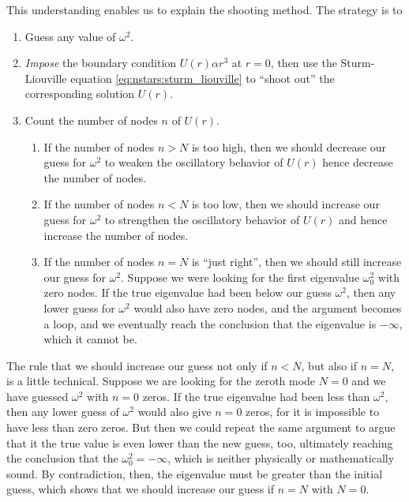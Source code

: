 This understanding enables us to explain the shooting method.
The strategy is to
\begin{enumerate}
\item Guess any value of $\omega^2$.
\item \emph{Impose} the boundary condition $U(r) \alpha r^3$ at $r = 0$, then use the Sturm-Liouville equation \eqref{eq:nstars:sturm_liouville} to ``shoot out'' the corresponding solution $U(r)$.
\item Count the number of nodes $n$ of $U(r)$.
      \begin{enumerate}
      \item If the number of nodes $n > N$ is too high, then we should decrease our guess for $\omega^2$ to weaken the oscillatory behavior of $U(r)$ hence decrease the number of nodes.
      \item If the number of nodes $n < N$ is too low, then we should increase our guess for $\omega^2$ to strengthen the oscillatory behavior of $U(r)$ and hence increase the number of nodes.
      \item If the number of nodes $n = N$ is ``just right'', then we should still increase our guess for $\omega^2$.
            Suppose we were looking for the first eigenvalue $\omega_0^2$ with zero nodes.
            If the true eigenvalue had been below our guess $\omega^2$, then any lower guess for $\omega^2$ would also have zero nodes, and the argument becomes a loop, and we eventually reach the conclusion that the eigenvalue is $-\infty$, which it cannot be.
      \end{enumerate}
\end{enumerate}
The rule that we should increase our guess not only if $n < N$, but also if $n = N$, is a little technical.
Suppose we are looking for the zeroth mode $N = 0$ and we have guessed $\omega^2$ with $n = 0$ zeros.
If the true eigenvalue had been less than $\omega^2$, then any lower guess of $\omega^2$ would also give $n = 0$ zeros, for it is impossible to have less than zero zeros.
But then we could repeat the same argument to argue that it the true value is even lower than the new guess, too, ultimately reaching the conclusion that the $\omega_0^2 = -\infty$, which is neither physically or mathematically sound.
By contradiction, then, the eigenvalue must be greater than the initial guess, which shows that we should increase our guess if $n = N$ with $N = 0$.

